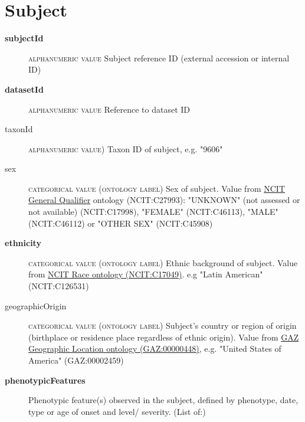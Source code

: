 \documentclass[a4paper, 10pt]{article}        %
\begin{document}
\section*{{\color{teal} Subject}}
\begin{description}
	\item[\textbf{subjectId}]  {\textsc{alphanumeric value}} Subject reference ID (external accession or internal ID)
	\item[\textbf{datasetId}] {\textsc{alphanumeric value}} Reference to dataset ID 
	\item[taxonId] {\textsc{alphanumeric value)}} Taxon ID of subject, e.g. "9606"
	\item[sex] {\textsc{categorical value (ontology label)}} Sex of subject. Value from \href{https://www.ebi.ac.uk/ols/ontologies/ncit/terms?iri=http%3A%2F%2Fpurl.obolibrary.org%2Fobo%2FNCIT_C27993&viewMode=All&siblings=false}{NCIT General Qualifier} ontology (NCIT:C27993): "UNKNOWN" (not assessed or not available) (NCIT:C17998), "FEMALE" (NCIT:C46113), "MALE" (NCIT:C46112) or "OTHER SEX" (NCIT:C45908)
	\item[\textbf{ethnicity}] {\textsc{categorical value (ontology label)}} Ethnic background of subject. Value from \href{https://www.ebi.ac.uk/ols/ontologies/ncit/terms?iri=http%3A%2F%2Fpurl.obolibrary.org%2Fobo%2FNCIT_C17049}{NCIT Race ontology (NCIT:C17049)}. e.g "Latin American" (NCIT:C126531)
	\item[geographicOrigin] {\textsc{categorical value (ontology label)}} Subject's country or region of origin (birthplace or residence place regardless of ethnic origin). Value from \href{https://www.ebi.ac.uk/ols/ontologies/gaz/terms?iri=http%3A%2F%2Fpurl.obolibrary.org%2Fobo%2FGAZ_00000448}{GAZ Geographic Location ontology (GAZ:00000448)}, e.g. "United States of America" (GAZ:00002459)
	\item[\textbf{phenotypicFeatures}] Phenotypic feature(s) observed in the subject, defined by phenotype, date, type or age of onset and level/ severity. (List of:)

\end{description}
\end{document}
